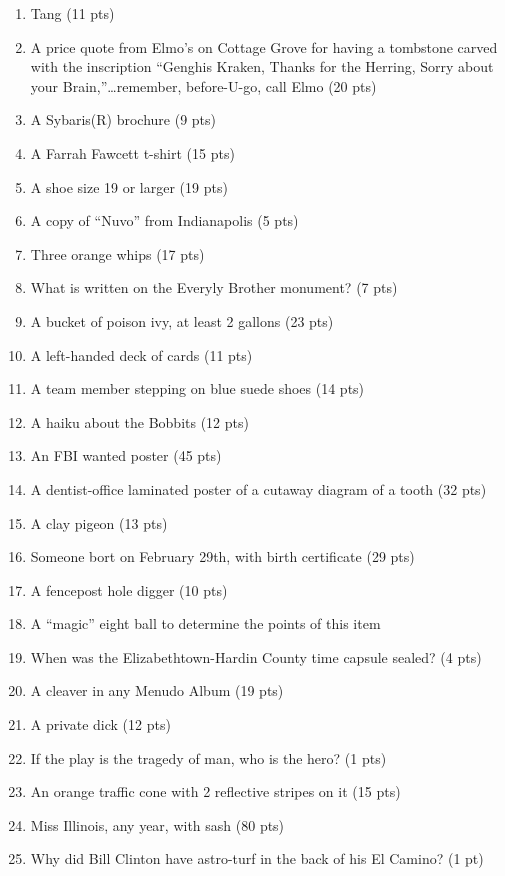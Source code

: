 \begin{enumerate}
\item Tang{\texttrademark} (11 pts)
\item A price quote from Elmo's on Cottage Grove for having a tombstone carved with the inscription ``Genghis Kraken, Thanks for the Herring, Sorry about your Brain,''{\dots}remember, before-U-go, call Elmo (20 pts)
\item A Sybaris(R) brochure (9 pts)
\item A Farrah Fawcett t-shirt (15 pts)
\item A shoe size 19 or larger (19 pts)
\item A copy of ``Nuvo'' from Indianapolis (5 pts)
\item Three orange whips (17 pts)
\item What is written on the Everyly Brother monument? (7  pts)
\item A bucket of poison ivy, at least 2 gallons (23 pts)
\item A left-handed deck of cards (11 pts)
\item A team member stepping on blue suede shoes (14 pts)
\item A haiku about the Bobbits (12 pts)
\item An FBI wanted poster (45 pts)
\item A dentist-office laminated poster of a cutaway diagram of a tooth (32 pts)
\item A clay pigeon (13 pts)
\item Someone bort on February 29th, with birth certificate (29 pts)
\item A fencepost hole digger (10 pts)
\item A ``magic'' eight ball to determine the points of this item
\item When was the Elizabethtown-Hardin County time capsule sealed? (4 pts)
\item A cleaver in any Menudo Album (19 pts)
\item A private dick (12 pts)
\item If the play is the tragedy of man, who is the hero? (1 pts)
\item An orange traffic cone with 2 reflective stripes on it (15 pts)
\item Miss Illinois, any year, with sash (80 pts)
\item Why did Bill Clinton have astro-turf in the back of his El Camino? (1 pt)


\end{enumerate}
